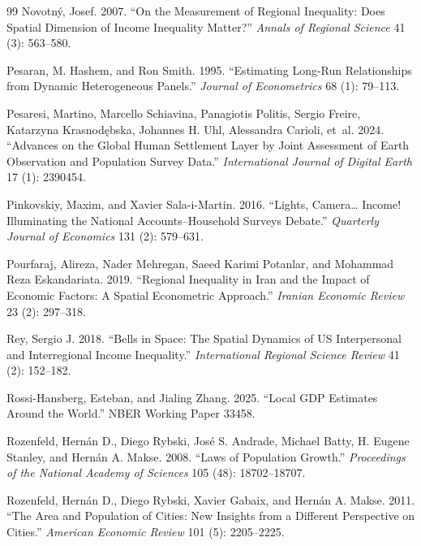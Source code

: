 \documentclass[11pt,a4paper]{article}
\begin{document}
\begin{thebibliography}{99}
Novotn\'y, Josef. 2007. ``On the Measurement of Regional Inequality: Does Spatial Dimension of Income Inequality Matter?'' \textit{Annals of Regional Science} 41 (3): 563--580.

Pesaran, M. Hashem, and Ron Smith. 1995. ``Estimating Long-Run Relationships from Dynamic Heterogeneous Panels.'' \textit{Journal of Econometrics} 68 (1): 79--113.

Pesaresi, Martino, Marcello Schiavina, Panagiotis Politis, Sergio Freire, Katarzyna Krasnod\k{e}bska, Johannes H. Uhl, Alessandra Carioli, et~al. 2024. ``Advances on the Global Human Settlement Layer by Joint Assessment of Earth Observation and Population Survey Data.'' \textit{International Journal of Digital Earth} 17 (1): 2390454.

Pinkovskiy, Maxim, and Xavier Sala-i-Martin. 2016. ``Lights, Camera\ldots{} Income! Illuminating the National Accounts--Household Surveys Debate.'' \textit{Quarterly Journal of Economics} 131 (2): 579--631.

Pourfaraj, Alireza, Nader Mehregan, Saeed Karimi Potanlar, and Mohammad Reza Eskandariata. 2019. ``Regional Inequality in Iran and the Impact of Economic Factors: A Spatial Econometric Approach.'' \textit{Iranian Economic Review} 23 (2): 297--318.

Rey, Sergio J. 2018. ``Bells in Space: The Spatial Dynamics of US Interpersonal and Interregional Income Inequality.'' \textit{International Regional Science Review} 41 (2): 152--182.

Rossi-Hansberg, Esteban, and Jialing Zhang. 2025. ``Local GDP Estimates Around the World.'' NBER Working Paper 33458.

Rozenfeld, Hern\'an D., Diego Rybski, Jos\'e S. Andrade, Michael Batty, H. Eugene Stanley, and Hern\'an A. Makse. 2008. ``Laws of Population Growth.'' \textit{Proceedings of the National Academy of Sciences} 105 (48): 18702--18707.

Rozenfeld, Hern\'an D., Diego Rybski, Xavier Gabaix, and Hern\'an A. Makse. 2011. ``The Area and Population of Cities: New Insights from a Different Perspective on Cities.'' \textit{American Economic Review} 101 (5): 2205--2225.


\end{thebibliography}
\end{document}
